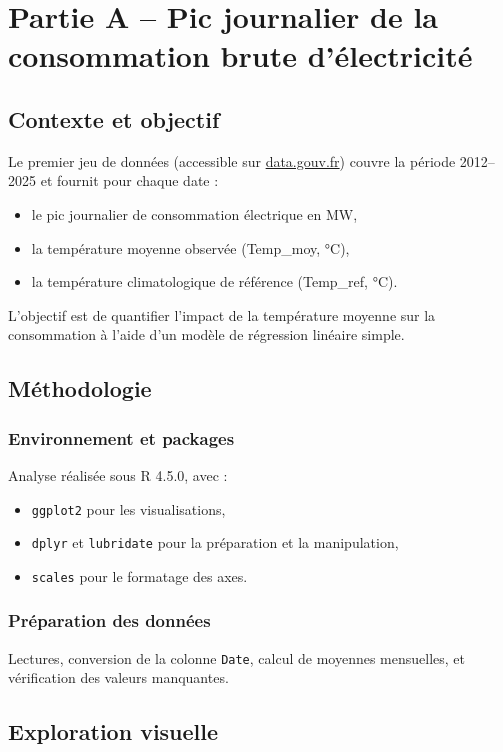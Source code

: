 \documentclass[12pt,a4paper]{article}
\begin{document}
\section{Partie A -- Pic journalier de la consommation brute d'électricité}
\subsection{Contexte et objectif}
Le premier jeu de données (accessible sur \href{https://www.data.gouv.fr/fr/datasets/pic-journalier-de-la-consommation-brute-delectricite/}{data.gouv.fr}) couvre la période 2012--2025 et fournit pour chaque date :
\begin{itemize}
  \item le pic journalier de consommation électrique en MW,
  \item la température moyenne observée (Temp\_moy, °C),
  \item la température climatologique de référence (Temp\_ref, °C).
\end{itemize}
L'objectif est de quantifier l'impact de la température moyenne sur la consommation à l'aide d'un modèle de régression linéaire simple.

\subsection{Méthodologie}
\subsubsection{Environnement et packages}
Analyse réalisée sous R 4.5.0, avec :
\begin{itemize}
  \item \texttt{ggplot2} pour les visualisations,
  \item \texttt{dplyr} et \texttt{lubridate} pour la préparation et la manipulation,
  \item \texttt{scales} pour le formatage des axes.
\end{itemize}

\subsubsection{Préparation des données}
Lectures, conversion de la colonne \texttt{Date}, calcul de moyennes mensuelles, et vérification des valeurs manquantes.

\subsection{Exploration visuelle}
\end{document}
